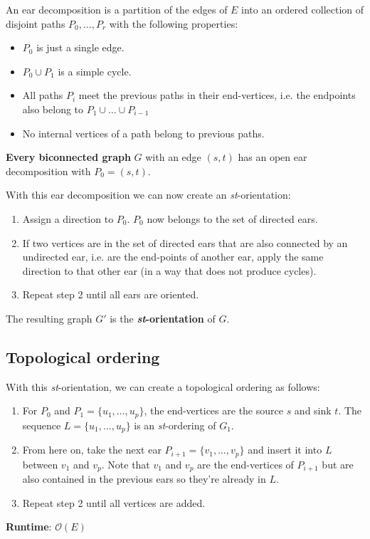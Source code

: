 \documentclass[10pt,a4paper]{article}
\begin{document}
An ear decomposition is a partition of the edges of $E$ into an ordered
collection of disjoint paths $P_0, \dots, P_r$ with the following properties:

\begin{itemize}
    \item $P_0$ is just a single edge.
    \item $P_0 \cup P_1$ is a simple cycle.
    \item All paths $P_i$ meet the previous paths in their end-vertices, i.e.
        the endpoints also belong to $P_1 \cup \dots \cup P_{i-1}$
    \item No internal vertices of a path belong to previous paths.
\end{itemize}

\textbf{Every biconnected graph} $G$ with an edge $(s, t)$ has an open ear
decomposition with $P_0 = (s, t)$.

With this ear decomposition we can now create an \textit{st}-orientation:
\begin{enumerate}
    \item Assign a direction to $P_0$.
        $P_0$ now belongs to the set of directed ears.
    \item If two vertices are in the set of directed ears that are also
        connected by an undirected ear, i.e. are the end-points of another ear,
        apply the same direction to that other ear (in a way that does not
        produce cycles).
    \item Repeat step 2 until all ears are oriented.
\end{enumerate}

The resulting graph $G'$ is the \textbf{\textit{st}-orientation} of $G$.

\subsection{Topological ordering}
With this \textit{st}-orientation, we can create a topological ordering as
follows:
\begin{enumerate}
    \item For $P_0$ and $P_1 = \{u_1, \dots, u_p\}$, the end-vertices are the
        source $s$ and sink $t$.
        The sequence $L = \{u_1, \dots, u_p\}$ is an \textit{st}-ordering of
        $G_1$.
    \item From here on, take the next ear $P_{i+1} = \{v_1, \dots, v_p\}$ and
        insert it into $L$ between $v_1$ and $v_p$.
        Note that $v_1$ and $v_p$ are the end-vertices of $P_{i+1}$ but are
        also contained in the previous ears so they're already in $L$.
    \item Repeat step 2 until all vertices are added.
\end{enumerate}

\textbf{Runtime}: $\mathcal{O}(E)$
\end{document}
